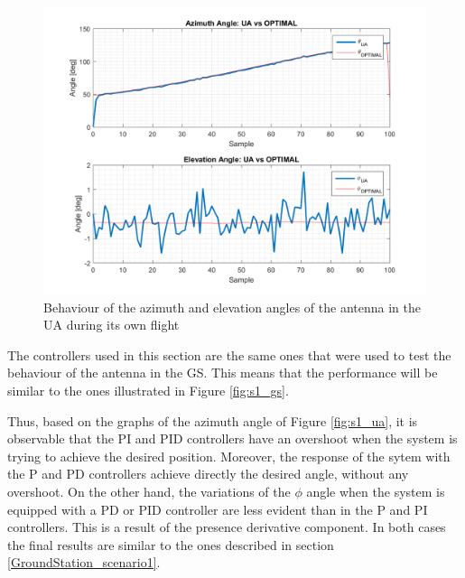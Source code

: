 \begin{figure}[H]
	\centering
	\includegraphics[scale=0.75]{figures/s1_pd_ua.png}
	\caption{Behaviour of the azimuth and elevation angles of the antenna in the UA during its own flight}
	\label{fig:s1_pd_ua_alone}
\end{figure}

The controllers used in this section are the same ones that were used to test the behaviour of the antenna in the GS. This means that the performance will be similar to the ones illustrated in Figure \ref{fig:s1_gs}.

Thus, based on the graphs of the azimuth angle of Figure \ref{fig:s1_ua}, it is observable that the PI and PID controllers have an overshoot when the system is trying to achieve the desired position. Moreover, the response of the sytem with the P and PD controllers achieve directly the desired angle, without any overshoot. On the other hand, the variations of the $\phi$ angle when the system is equipped with a PD or PID controller are less evident than in the P and PI controllers. This is a result of the presence derivative component. In both cases the final results are similar to the ones described in section \ref{GroundStation_scenario1}.

